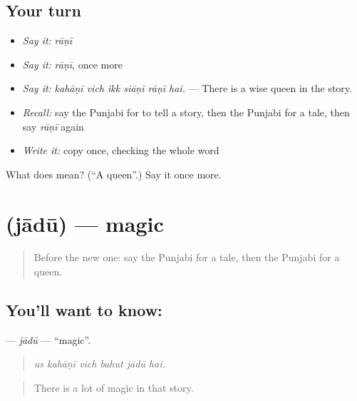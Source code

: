 \subsection*{Your turn}
\begin{itemize}
\raggedright
  \item \emph{Say it:} \emph{rāṇī}
  \item \emph{Say it:} \emph{rāṇī}, once more
  \item \emph{Say it:} \emph{kahāṇī vich ikk siāṇī rāṇī hai.} — There is a wise queen in the story.
  \item \emph{Recall:} say the Punjabi for to tell a story, then the Punjabi for a tale, then say \emph{rāṇī} again
  \item \emph{Write it:} copy \textbf{} once, checking the whole word
\end{itemize}

\begin{tcolorbox}[breakable,colback=teal!4,colframe=teal!35!black,title={Before you move on}]
What does  mean? (\textquotedblleft{}A queen\textquotedblright{}.) Say it once more.
\end{tcolorbox}
\section[\texorpdfstring{\pa{ਜਾਦੂ} (jādū)}{ਜਾਦੂ (jādū)}]{ (jādū) — magic}

\label{lesson:PA-C354-jadu}



\begin{quote}
Before the new one: say the Punjabi for a tale, then the Punjabi for a queen.
\end{quote}

\subsection*{You'll want to know: }
\textbf{} — \emph{jādū} — \textquotedblleft{}magic\textquotedblright{}.

\begin{quote}
     
\end{quote}

\begin{quote}
\emph{us kahāṇī vich bahut jādū hai.}
\end{quote}

\begin{quote}
There is a lot of magic in that story.
\end{quote}

